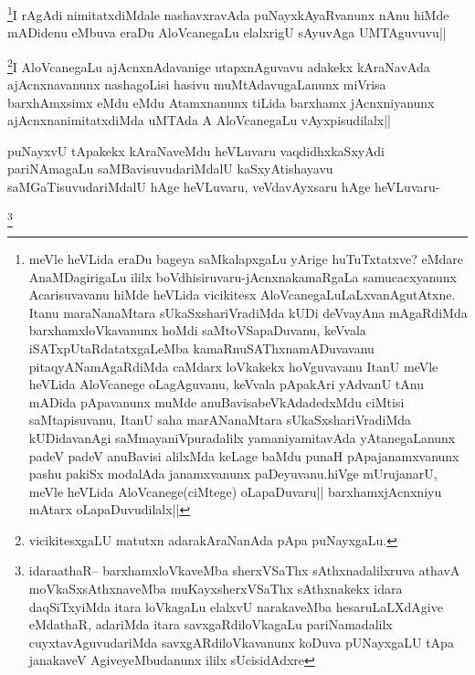 \begin{artha}
\footnote{meVle heVLida eraDu bageya saMkalapxgaLu yArige huTuTxtatxve? eMdare AnaMDagirigaLu ililx boVdhisiruvaru-jAcnxnakamaRgaLa samucacxyanunx Acarisuvavanu hiMde heVLida vicikitesx AloVcanegaLuLaLxvanAgutAtxne. Itanu maraNanaMtara sUkaSxshariVradiMda kUDi deVvayAna mAgaRdiMda barxhamxloVkavanunx hoMdi saMtoVSapaDuvanu, keVvala iSATxpUtaRdatatxgaLeMba kamaRnuSAThxnamADuvavanu pitaqyANamAgaRdiMda caMdarx loVkakekx hoVguvavanu ItanU meVle heVLida AloVcanege oLagAguvanu, keVvala pApakAri yAdvanU tAnu mADida pApavanunx muMde anuBavisabeVkAdadedxMdu ciMtisi saMtapisuvanu, ItanU saha marANanaMtara sUkaSxshariVradiMda kUDidavanAgi saMmayaniVpuradalilx yamaniyamitavAda yAtanegaLanunx padeV padeV anuBavisi alilxMda keLage baMdu punaH pApajanamxvanunx pashu pakiSx modalAda janamxvanunx paDeyuvanu.hiVge mUrujanarU, meVle heVLida AloVcanege(ciMtege) oLapaDuvaru|| barxhamxjAcnxniyu mAtarx oLapaDuvudilalx||}I rAgAdi nimitatxdiMdale nashavxravAda puNayxkAyaRvanunx nAnu hiMde mADidenu eMbuva eraDu AloVcanegaLu elalxrigU sAyuvAga UMTAguvuvu||
\end{artha}

\begin{artha}
\footnote{vicikitesxgaLU matutxn adarakAraNanAda pApa puNayxgaLu.}I AloVcanegaLu ajAcnxnAdavanige utapxnAguvavu adakekx kAraNavAda ajAcnxnavanunx nashagoLisi hasivu muMtAdavugaLanunx miVrisa barxhAmxsimx eMdu eMdu Atamxnanunx tiLida barxhamx jAcnxniyanunx ajAcnxnanimitatxdiMda uMTAda A AloVcanegaLu vAyxpisudilalx||
\end{artha}


\begin{artha}
puNayxvU tApakekx kAraNaveMdu heVLuvaru vaqdidhxkaSxyAdi pariNAmagaLu saMBavisuvudariMdalU kaSxyAtishayavu saMGaTisuvudariMdalU hAge heVLuvaru, veVdavAyxsaru hAge heVLuvaru-
\end{artha}

\begin{artha}
\footnote{idaraathaR-- barxhamxloVkaveMba sherxVSaThx sAthxnadalilxruva athavA moVkaSxsAthxnaveMba muKayxsherxVSaThx sAthxnakekx idara daqSiTxyiMda itara loVkagaLu elalxvU narakaveMba hesaruLaLXdAgive eMdathaR, adariMda itara savxgaRdiloVkagaLu pariNamadalilx cuyxtavAguvudariMda savxgARdiloVkavanunx koDuva pUNayxgaLU tApa janakaveV AgiveyeMbudanunx ililx sUcisidAdxre}
\end{artha}
